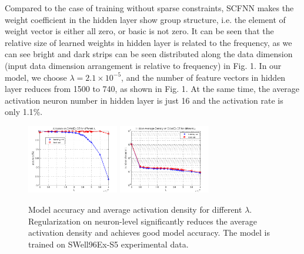 Compared to the case of training without sparse constraints, SCFNN makes the weight coefficient in the hidden layer show group structure, i.e. the element of weight vector is either all zero, or basic is not zero.
It can be seen that the relative size of learned weights in hidden layer is related to the frequency, as we can see bright and dark strips can be seen distributed along the data dimension (input data dimension arrangement is relative to frequency) in Fig. 1.
In our model, we choose $\lambda=2.1 \times 10^{-5} $, and the number of feature vectors in hidden layer reduces from 1500 to 740, as shown in Fig. 1. At the same time, the average activation neuron number in hidden layer is just 16 and the activation rate is only 1.1{\%}.
\begin{figure}
\includegraphics[width=4cm,height=3cm]{figure/Accuracy_on_SWellEx_S5_for_different_lambda}
\includegraphics[width=4cm,height=3cm]{figure/Hidden_Average_Density_on_SWellEx_S5_for_different_lambda}
\caption{Model accuracy and average activation density for different $\lambda $. Regularization on neuron-level
significantly reduces the average activation density and achieves good model accuracy. The model is trained on SWell96Ex-S5 experimental data.}
\end{figure}

